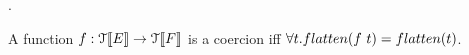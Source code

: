 \documentclass[a4paper,UKenglish,cleveref, autoref, thm-restate]{lipics-v2021}
\begin{document}
.
\begin{definition}[Coercion]
A function $f :\mathcal{T}\llbracket E \rrbracket \rightarrow \mathcal{T}\llbracket F \rrbracket$ is a coercion iff $\forall \mathsf{t}. \flatten{f~\mathsf{t}} = \flatten{\mathsf{t}}$.\\
\end{definition}
\end{document}
